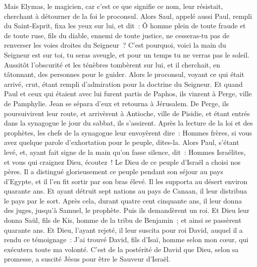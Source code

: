 \begin{multicols}{2}
Mais Elymas, le magicien, car c'est ce que signifie ce nom, leur résistait, cherchant à détourner de la foi le proconsul.
Alors Saul, appelé aussi Paul, rempli du Saint-Esprit, fixa les yeux sur lui, et dit~:
Ô homme plein de toute fraude et de toute ruse, fils du diable, ennemi de toute justice, ne cesseras-tu pas de renverser les voies droites du Seigneur~?
C'est pourquoi, voici la main du Seigneur est sur toi, tu seras aveugle, et pour un temps tu ne verras pas le soleil. Aussitôt l'obscurité et les ténèbres tombèrent sur lui, et il cherchait, en tâtonnant, des personnes pour le guider.
Alors le proconsul, voyant ce qui était arrivé, crut, étant rempli d'admiration pour la doctrine du Seigneur.
Et quand Paul et ceux qui étaient avec lui furent partis de Paphos, ils vinrent à Perge, ville de Pamphylie. Jean se sépara d'eux et retourna à Jérusalem.
De Perge, ils poursuivirent leur route, et arrivèrent à Antioche, ville de Pisidie, et étant entrés dans la synagogue le jour du sabbat, ils s'assirent.
Après la lecture de la loi et des prophètes, les chefs de la synagogue leur envoyèrent dire~: Hommes frères, si vous avez quelque parole d'exhortation pour le peuple, dites-la.
Alors Paul, s'étant levé, et, ayant fait signe de la main qu'on fasse silence, dit~: Hommes Israélites, et vous qui craignez Dieu, écoutez~!
Le Dieu de ce peuple d'Israël a choisi nos pères. Il a distingué glorieusement ce peuple pendant son séjour au pays d'Egypte, et il l'en fit sortir par son bras élevé.
Il les supporta au désert environ quarante ans.
Et ayant détruit sept nations au pays de Canaan, il leur distribua le pays par le sort.
Après cela, durant quatre cent cinquante ans, il leur donna des juges, jusqu'à Samuel, le prophète.
Puis ils demandèrent un roi. Et Dieu leur donna Saül, fils de Kis, homme de la tribu de Benjamin~; et ainsi se passèrent quarante ans.
Et Dieu, l'ayant rejeté, il leur suscita pour roi David, auquel il a rendu ce témoignage~: J'ai trouvé David, fils d'Isaï, homme selon mon cœur, qui exécutera toute ma volonté.
C'est de la postérité de David que Dieu, selon sa promesse, a suscité Jésus pour être le Sauveur d'Israël.

\end{multicols}
